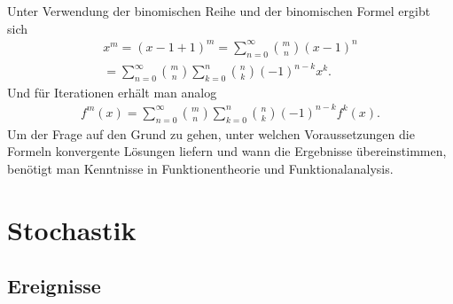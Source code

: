 \documentclass[a4paper,11pt,fleqn,twocolumn,twoside]{scrartcl}
\numberwithin{equation}{section}
\begin{document}
Unter Verwendung der binomischen Reihe und der binomischen Formel
ergibt sich
\begin{gather*}
x^m = (x-1+1)^m = \sum_{n=0}^\infty \binom{m}{n}(x-1)^n\\
= \sum_{n=0}^\infty \binom{m}{n}\sum_{k=0}^n\binom{n}{k}(-1)^{n-k}x^k.
\end{gather*}
Und für Iterationen erhält man analog
\begin{gather*}
f^m(x) = \sum_{n=0}^\infty \binom{m}{n}
\sum_{k=0}^n\binom{n}{k}(-1)^{n-k}f^k(x).
\end{gather*}
Um der Frage auf den Grund zu gehen, unter welchen Voraussetzungen
die Formeln konvergente Lösungen liefern und wann die Ergebnisse
übereinstimmen, benötigt man Kenntnisse in Funktionentheorie
und Funktionalanalysis.


\newpage
\section{Stochastik}
\subsection{Ereignisse}
\end{document}
